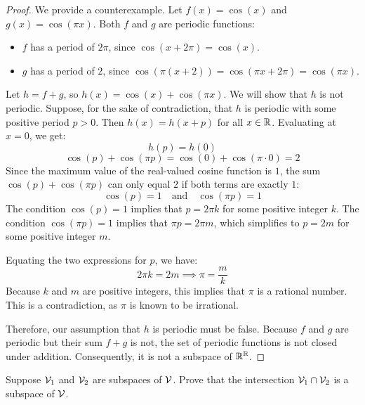 \begin{proof}
	We provide a counterexample. Let $f(x) = \cos(x)$ and $g(x) = \cos(\pi x)$. 
	Both $f$ and $g$ are periodic functions:
	\begin{itemize}
		\item $f$ has a period of $2\pi$, since $\cos(x + 2\pi) = \cos(x)$.
		\item $g$ has a period of $2$, since $\cos(\pi(x + 2)) = \cos(\pi x + 2\pi) = \cos(\pi x)$.
	\end{itemize}
	
	Let $h = f + g$, so $h(x) = \cos(x) + \cos(\pi x)$. We will show that $h$ is not periodic. 
	Suppose, for the sake of contradiction, that $h$ is periodic with some positive period $p > 0$. Then $h(x) = h(x + p)$ for all $x \in \mathbb{R}$. 
	Evaluating at $x = 0$, we get:
	\[ h(p) = h(0) \]
	\[ \cos(p) + \cos(\pi p) = \cos(0) + \cos(\pi \cdot 0) = 2 \]
	Since the maximum value of the real-valued cosine function is $1$, the sum $\cos(p) + \cos(\pi p)$ can only equal $2$ if both terms are exactly $1$:
	\[ \cos(p) = 1 \quad \text{and} \quad \cos(\pi p) = 1 \]
	The condition $\cos(p) = 1$ implies that $p = 2\pi k$ for some positive integer $k$. 
	The condition $\cos(\pi p) = 1$ implies that $\pi p = 2\pi m$, which simplifies to $p = 2m$ for some positive integer $m$. 
	
	Equating the two expressions for $p$, we have:
	\[ 2\pi k = 2m \implies \pi = \frac{m}{k} \]
	Because $k$ and $m$ are positive integers, this implies that $\pi$ is a rational number. This is a contradiction, as $\pi$ is known to be irrational. 
	
	Therefore, our assumption that $h$ is periodic must be false. Because $f$ and $g$ are periodic but their sum $f + g$ is not, the set of periodic functions is not closed under addition. Consequently, it is not a subspace of $\mathbb{R}^{\mathbb{R}}$.
\end{proof}
\begin{question}
	Suppose $\mathcal{V}_1$ and $\mathcal{V}_2$ are subspaces of $\mathcal{V}$. Prove that the intersection $\mathcal{V}_1 \cap \mathcal{V}_2$ is a subspace of $\mathcal{V}$.
\end{question}
